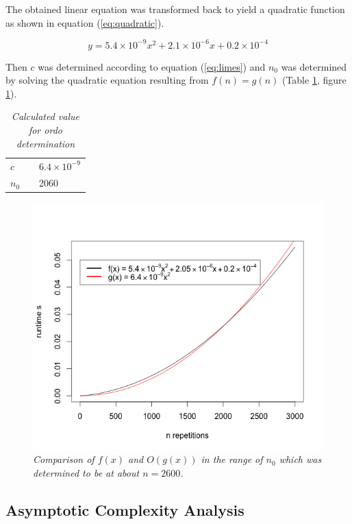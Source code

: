 \documentclass[a4paper,11pt,twoside]{article}
\begin{document}
The obtained linear equation was transformed back to yield a
quadratic function as shown in equation (\ref{eq:quadratic}).

\begin{equation} \label{eq:quadratic}
y = 5.4 \times 10^{-9}x^2 + 2.1 \times 10^{-6}x + 0.2 \times 10^{-4}
\end{equation}

Then $c$ was determined according to equation (\ref{eq:limes}) and
$n_0$ was determined by solving the quadratic equation resulting from
$f(n) = g(n)$ (Table \ref{tab:ordo}, figure \ref{fig:ordo}). 

\begin{table}[]
\caption{\textit{Calculated value for ordo determination}}
\label{tab:ordo}
\begin{tabular}{lll}
$c$                       &  & $6.4 \times 10^{-9}$ \\
\multicolumn{1}{c}{$n_0$} &  & 2060                
\end{tabular}
\end{table}


\begin{figure} 
\includegraphics[width=\textwidth]{ordo.png}
\caption{\textit{Comparison of $f(x)$ and $O(g(x))$ in the range of $n_{0}$
  which was determined to be at about $n = 2600$.}}
\label{fig:ordo}
\end{figure}

\subsection{Asymptotic Complexity Analysis}
\end{document}

